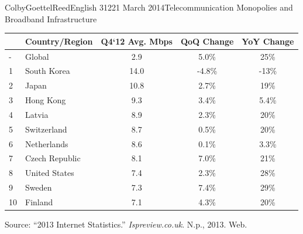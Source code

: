 \documentclass[12pt]{article}
\begin{document}
\begin{mla}{Colby}{Goettel}{Reed}{English 312}{21 March 2014}{Telecommunication Monopolies and Broadband Infrastructure}
\begin{minipage}{\linewidth}
    \label{table:connection-speed}
    \begin{tabular}{llccc}
        \toprule
        ~  & Country/Region & Q4`12 Avg. Mbps & QoQ Change & YoY Change \\
        \midrule
        -  & Global         & 2.9  & 5.0\%  & 25\% \\
        1  & South Korea    & 14.0 & -4.8\% & -13\% \\
        2  & Japan          & 10.8 & 2.7\%  & 19\% \\
        3  & Hong Kong      & 9.3  & 3.4\%  & 5.4\% \\
        4  & Latvia         & 8.9  & 2.3\%  & 20\% \\
        5  & Switzerland    & 8.7  & 0.5\%  & 20\% \\
        6  & Netherlands    & 8.6  & 0.1\%  & 3.3\% \\
        7  & Czech Republic & 8.1  & 7.0\%  & 21\% \\
        8  & United States  & 7.4  & 2.3\%  & 28\% \\
        9  & Sweden         & 7.3  & 7.4\%  & 29\% \\
        10 & Finland        & 7.1  & 4.3\%  & 20\% \\
        \bottomrule
    \end{tabular}\par
    \bigskip
    Source: ``2013 Internet Statistics.'' \textit{Ispreview.co.uk}. N.p., 2013. Web.\bigskip
\end{minipage}


\end{mla}
\end{document}
